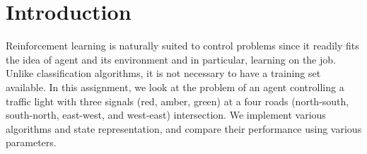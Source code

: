 \section {Introduction}

Reinforcement learning is naturally suited to control problems
since it readily fits the idea of agent and its environment and
in particular, learning on the job. Unlike classification algorithms,
it is not necessary to have a training set available. In this assignment,
we look at the problem of an agent controlling a traffic light with
three signals (red, amber, green) at a four roads (north-south,
south-north, east-west, and west-east) intersection. We implement various algorithms
and state representation, and compare their performance using
various parameters.
